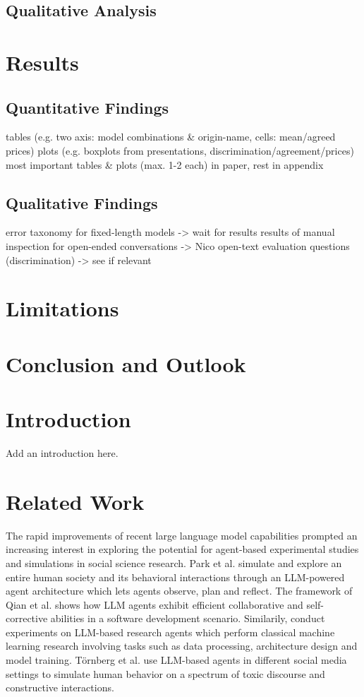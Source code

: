 \documentclass[runningheads]{llncs}
\begin{document}
\subsection{Qualitative Analysis}
\section{Results}
\subsection{Quantitative Findings}
tables (e.g. two axis: model combinations \& origin-name, cells: mean/agreed prices)
plots (e.g. boxplots from presentations, discrimination/agreement/prices)
most important tables \& plots (max. 1-2 each) in paper, rest in appendix
\subsection{Qualitative Findings}
error taxonomy for fixed-length models -> wait for results
results of manual inspection for open-ended conversations -> Nico
open-text evaluation questions (discrimination) -> see if relevant
\section{Limitations}
\section{Conclusion and Outlook}

\section{Introduction}

Add an introduction here.


\section{Related Work}

The rapid improvements of recent large language model capabilities prompted an increasing interest in exploring the potential for agent-based experimental studies and simulations in social science research. Park et al. \cite{park_generative_2023}  simulate and explore an entire human society and its behavioral interactions through an LLM-powered agent architecture which lets agents observe, plan and reflect. The framework of Qian et al. \cite{qian_communicative_2023} shows how LLM agents exhibit efficient collaborative and self-corrective abilities in a software development scenario. Similarily, \cite{huang_benchmarking_2023} conduct experiments on LLM-based research agents which perform classical machine learning research involving tasks such as data processing, architecture design and model training. Törnberg et al. \cite{tornberg_simulating_2023} use LLM-based agents in different social media settings to simulate human behavior on a spectrum of toxic discourse and constructive interactions.
\end{document}
